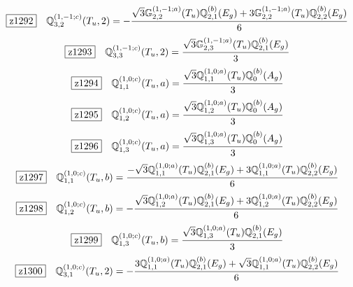 \documentclass[fleqn,10pt,landscape]{jsarticle}
\begin{document}
\begin{dmath*}
\hspace*{3mm}\fbox{z1292}\quad \mathbb{Q}_{3,2}^{(1,-1;c)}(T_{u},2)=- \frac{\sqrt{3} \mathbb{G}_{2,2}^{(1,-1;a)}(T_{u}) \mathbb{Q}_{2,1}^{(b)}(E_{g}) + 3 \mathbb{G}_{2,2}^{(1,-1;a)}(T_{u}) \mathbb{Q}_{2,2}^{(b)}(E_{g})}{6}
\end{dmath*}
\begin{dmath*}
\hspace*{3mm}\fbox{z1293}\quad \mathbb{Q}_{3,3}^{(1,-1;c)}(T_{u},2)=\frac{\sqrt{3} \mathbb{G}_{2,3}^{(1,-1;a)}(T_{u}) \mathbb{Q}_{2,1}^{(b)}(E_{g})}{3}
\end{dmath*}
\begin{dmath*}
\hspace*{3mm}\fbox{z1294}\quad \mathbb{Q}_{1,1}^{(1,0;c)}(T_{u},a)=\frac{\sqrt{3} \mathbb{Q}_{1,1}^{(1,0;a)}(T_{u}) \mathbb{Q}_{0}^{(b)}(A_{g})}{3}
\end{dmath*}
\begin{dmath*}
\hspace*{3mm}\fbox{z1295}\quad \mathbb{Q}_{1,2}^{(1,0;c)}(T_{u},a)=\frac{\sqrt{3} \mathbb{Q}_{1,2}^{(1,0;a)}(T_{u}) \mathbb{Q}_{0}^{(b)}(A_{g})}{3}
\end{dmath*}
\begin{dmath*}
\hspace*{3mm}\fbox{z1296}\quad \mathbb{Q}_{1,3}^{(1,0;c)}(T_{u},a)=\frac{\sqrt{3} \mathbb{Q}_{1,3}^{(1,0;a)}(T_{u}) \mathbb{Q}_{0}^{(b)}(A_{g})}{3}
\end{dmath*}
\begin{dmath*}
\hspace*{3mm}\fbox{z1297}\quad \mathbb{Q}_{1,1}^{(1,0;c)}(T_{u},b)=\frac{- \sqrt{3} \mathbb{Q}_{1,1}^{(1,0;a)}(T_{u}) \mathbb{Q}_{2,1}^{(b)}(E_{g}) + 3 \mathbb{Q}_{1,1}^{(1,0;a)}(T_{u}) \mathbb{Q}_{2,2}^{(b)}(E_{g})}{6}
\end{dmath*}
\begin{dmath*}
\hspace*{3mm}\fbox{z1298}\quad \mathbb{Q}_{1,2}^{(1,0;c)}(T_{u},b)=- \frac{\sqrt{3} \mathbb{Q}_{1,2}^{(1,0;a)}(T_{u}) \mathbb{Q}_{2,1}^{(b)}(E_{g}) + 3 \mathbb{Q}_{1,2}^{(1,0;a)}(T_{u}) \mathbb{Q}_{2,2}^{(b)}(E_{g})}{6}
\end{dmath*}
\begin{dmath*}
\hspace*{3mm}\fbox{z1299}\quad \mathbb{Q}_{1,3}^{(1,0;c)}(T_{u},b)=\frac{\sqrt{3} \mathbb{Q}_{1,3}^{(1,0;a)}(T_{u}) \mathbb{Q}_{2,1}^{(b)}(E_{g})}{3}
\end{dmath*}
\begin{dmath*}
\hspace*{3mm}\fbox{z1300}\quad \mathbb{Q}_{3,1}^{(1,0;c)}(T_{u},2)=- \frac{3 \mathbb{Q}_{1,1}^{(1,0;a)}(T_{u}) \mathbb{Q}_{2,1}^{(b)}(E_{g}) + \sqrt{3} \mathbb{Q}_{1,1}^{(1,0;a)}(T_{u}) \mathbb{Q}_{2,2}^{(b)}(E_{g})}{6}
\end{dmath*}
\end{document}
